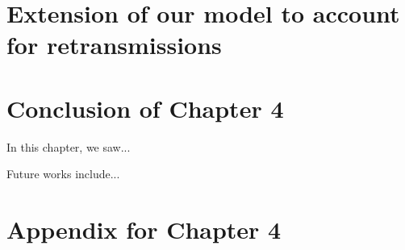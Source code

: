 




\section{Extension of our model to account for retransmissions}
\label{sec:4:retransmissions}





\section{Conclusion of Chapter 4}
\label{sec:4:conclusion}


In this chapter, we saw...

Future works include...


\section{Appendix for Chapter 4}
\label{sec:4:appendix}


